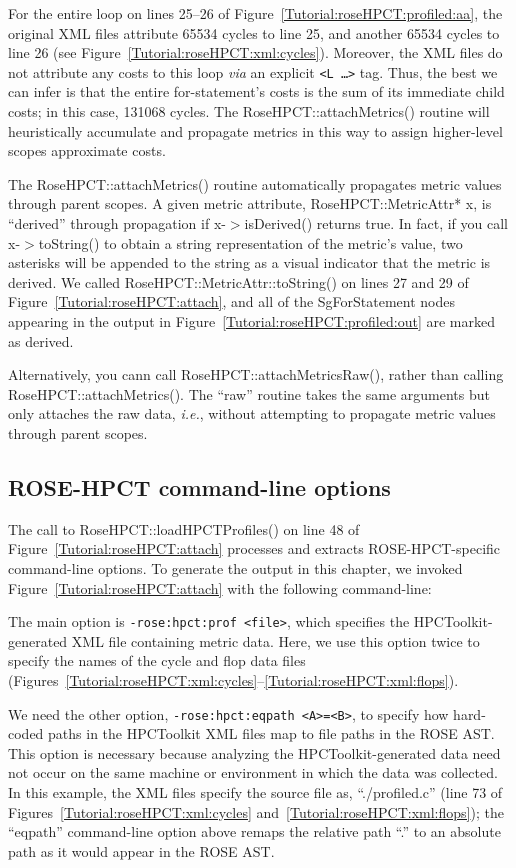 For the entire loop on lines 25--26 of
Figure~\ref{Tutorial:roseHPCT:profiled:aa}, the original XML files
attribute 65534 cycles to line 25, and another 65534 cycles to line 26
(see Figure~\ref{Tutorial:roseHPCT:xml:cycles}). Moreover, the XML
files do not attribute any costs to this loop \emph{via} an explicit
\texttt{<L \ldots>} tag. Thus, the best we can infer is that the
entire for-statement's costs is the sum of its immediate child costs;
in this case, 131068 cycles. The RoseHPCT::attachMetrics() routine
will heuristically accumulate and propagate metrics in this way to
assign higher-level scopes approximate costs.

The RoseHPCT::attachMetrics() routine automatically propagates metric
values through parent scopes. A given metric attribute,
RoseHPCT::MetricAttr* x, is ``derived'' through propagation if
x-$>$isDerived() returns true. In fact, if you call x-$>$toString() to
obtain a string representation of the metric's value, two asterisks
will be appended to the string as a visual indicator that the metric
is derived. We called RoseHPCT::MetricAttr::toString() on lines 27 and
29 of Figure~\ref{Tutorial:roseHPCT:attach}, and all of the
SgForStatement nodes appearing in the output in
Figure~\ref{Tutorial:roseHPCT:profiled:out} are marked as derived.

Alternatively, you cann call RoseHPCT::attachMetricsRaw(), rather than
calling RoseHPCT::attachMetrics().  The ``raw'' routine takes the same
arguments but only attaches the raw data, \emph{i.e.}, without
attempting to propagate metric values through parent scopes.

\subsection{ROSE-HPCT command-line options}
\label{sec:rosehpct:cmdlineopts}

The call to RoseHPCT::loadHPCTProfiles() on line 48 of
Figure~\ref{Tutorial:roseHPCT:attach} processes and extracts
ROSE-HPCT-specific command-line options. To generate the output in
this chapter, we invoked Figure~\ref{Tutorial:roseHPCT:attach} with
the following command-line:



The main option is \texttt{-rose:hpct:prof <file>}, which specifies
the HPCToolkit-generated XML file containing metric data. Here, we use
this option twice to specify the names of the cycle and flop data
files
(Figures~\ref{Tutorial:roseHPCT:xml:cycles}--\ref{Tutorial:roseHPCT:xml:flops}).

We need the other option, \texttt{-rose:hpct:eqpath <A>=<B>}, to
specify how hard-coded paths in the HPCToolkit XML files map to file
paths in the ROSE AST. This option is necessary because analyzing the
HPCToolkit-generated data need not occur on the same machine or
environment in which the data was collected. In this example, the XML
files specify the source file as, ``./profiled.c'' (line 73 of
Figures~\ref{Tutorial:roseHPCT:xml:cycles}
and~\ref{Tutorial:roseHPCT:xml:flops}); the ``eqpath'' command-line
option above remaps the relative path ``.'' to an absolute path as it
would appear in the ROSE AST.

